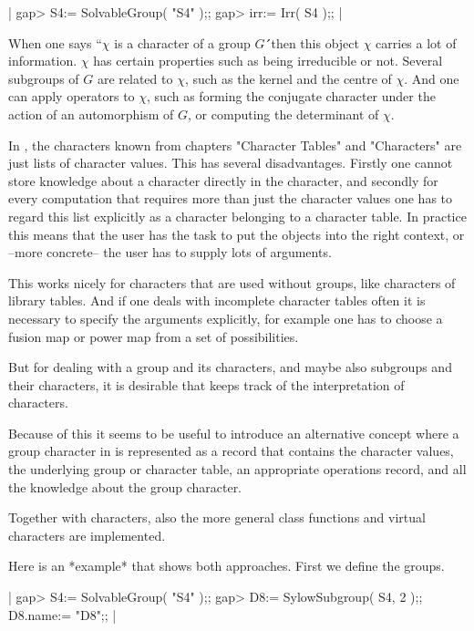 |    gap> S4:= SolvableGroup( "S4" );;
    gap> irr:= Irr( S4 );; |


When one says ``$\chi$ is a character of a group $G$\'\'\ then this object
$\chi$ carries a lot of information.  $\chi$ has certain properties such as
being irreducible or not.  Several subgroups of $G$ are related to $\chi$,
such as the kernel and the centre of $\chi$.  And one can apply operators
to $\chi$, such as forming the conjugate character under the action of an
automorphism of $G$, or computing the determinant of $\chi$.

In {\GAP}, the characters known from chapters "Character Tables" and
"Characters" are just lists of character values.  This has several
disadvantages.  Firstly one cannot store knowledge about a character
directly in the character, and secondly for every computation that requires
more than just the character values one has to regard this list explicitly as
a character belonging to a character table.
In practice this means that the user has the task to put the objects into
the right context, or --more concrete-- the user has to supply lots of
arguments.

This works nicely for characters that are used without groups, like
characters of library tables.  And if one deals with incomplete character
tables often it is necessary to specify the arguments explicitly, for
example one has to choose a fusion map or power map from a set of
possibilities.

But for dealing with a group and its characters, and maybe also subgroups
and their characters, it is desirable that {\GAP} keeps track of the
interpretation of characters.

Because of this it seems to be useful to introduce an alternative concept
where a group character in {\GAP} is represented as a record that contains
the character values, the underlying group or character table, an
appropriate operations record, and all the knowledge about the group
character.

Together with characters, also the more general class functions and
virtual characters are implemented.

Here is an *example* that shows both approaches.
First we define the groups.

|    gap> S4:= SolvableGroup( "S4" );;
    gap> D8:= SylowSubgroup( S4, 2 );; D8.name:= "D8";; |

